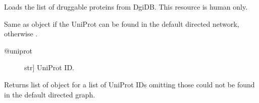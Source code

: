 \documentclass[letterpaper,10pt,english]{sphinxmanual}
\begin{document}
\begin{fulllineitems}
\begin{fulllineitems}
\end{fulllineitems}


\begin{fulllineitems}
\label{\detokenize{main:pypath.main.PyPath.dproteins}}
\end{fulllineitems}


\begin{fulllineitems}
\label{\detokenize{main:pypath.main.PyPath.dps}}
\end{fulllineitems}


\begin{fulllineitems}
\label{\detokenize{main:pypath.main.PyPath.druggability_list}}
Loads the list of druggable proteins from DgiDB. This resource
is human only.

\end{fulllineitems}


\begin{fulllineitems}
\label{\detokenize{main:pypath.main.PyPath.duniprot}}
Same as  object if the UniProt
can be found in the default directed network,
otherwise .
\begin{description}
\item[{@uniprot}] \leavevmode{[}str{]}
UniProt ID.

\end{description}

\end{fulllineitems}


\begin{fulllineitems}
\label{\detokenize{main:pypath.main.PyPath.duniprots}}
Returns list of  object
for a list of UniProt IDs omitting those
could not be found in the default
directed graph.


\end{fulllineitems}
\end{fulllineitems}
\end{document}
